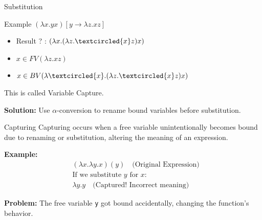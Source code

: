 \documentclass{beamer}
\begin{document}

  



\begin{frame}{Substitution}
  \begin{block}{Example}
    $(\lambda x.yx)[y \to \lambda z.xz]$
  \end{block}
  \begin{itemize}
    \item Result ? : $(\lambda x.(\lambda z.\textcircled{x}z)x)$
    \item $x \in FV(\lambda z.xz)$
    \item $x \in BV(\lambda \textcircled{x}.(\lambda z.\textcircled{x}z)x)$
  \end{itemize}
  This is called Variable Capture.\\
  \begin{block}{}
    \textbf{Solution:} Use $\alpha$-conversion to rename bound variables before substitution.
  \end{block}
  \vspace{1em}
\end{frame}

\begin{frame}{Capturing}
  Capturing occurs when a free variable unintentionally becomes bound due to renaming or substitution, altering the meaning of an expression.
  
  \vspace{0.5cm}
  \textbf{Example:}
  \begin{align*}
      & (\lambda x. \lambda y. x) (y) \quad \text{(Original Expression)} \\
      & \text{If we substitute } y \text{ for } x:\\
      & \lambda y. y \quad \text{(Captured! Incorrect meaning)}
  \end{align*}

  \vspace{0.5cm}
  \textbf{Problem:} The free variable \texttt{y} got bound accidentally, changing the function's behavior.
\end{frame}
\end{document}
